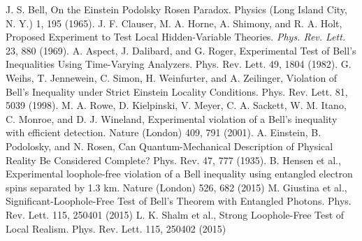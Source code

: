 \documentclass[prd,showpacs,twocolumn]{revtex4-1}
\begin{document}
\begin{thebibliography}{0}

 J. S. Bell, On the Einstein Podolsky Rosen Paradox. Physics (Long Island City, N. Y.) 1, 195 (1965).
 J. F. Clauser, M. A. Horne, A. Shimony, and R. A. Holt, Proposed Experiment to Test Local Hidden-Variable
Theories. \emph{Phys. Rev. Lett.} 23, 880 (1969).
 A. Aspect, J. Dalibard, and G. Roger, Experimental Test of Bell's Inequalities Using Time-Varying Analyzers. Phys. Rev. Lett. 49, 1804 (1982).
 G. Weihs, T. Jennewein, C. Simon, H. Weinfurter, and A. Zeilinger, Violation of Bell's Inequality under Strict
Einstein Locality Conditions. Phys. Rev. Lett. 81, 5039 (1998).
 M. A. Rowe, D. Kielpinski, V. Meyer, C. A. Sackett, W. M. Itano, C. Monroe, and D. J. Wineland, Experimental violation of a Bell's inequality with efficient detection. Nature (London) 409, 791 (2001).
 A. Einstein, B. Podolosky, and N. Rosen, Can Quantum-Mechanical Description of Physical Reality Be Considered Complete? Phys. Rev. 47, 777 (1935).
 B. Hensen et al., Experimental loophole-free violation of a Bell inequality using entangled electron
spins separated by 1.3 km. Nature (London) 526, 682 (2015)
 M. Giustina et al., Significant-Loophole-Free Test of Bell’s Theorem with Entangled Photons. Phys. Rev. Lett. 115, 250401 (2015)
 L. K. Shalm et al., Strong Loophole-Free Test of Local Realism. Phys. Rev. Lett. 115, 250402 (2015)
\end{thebibliography}
\end{document}
